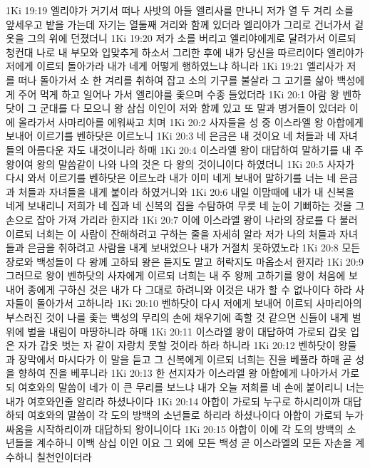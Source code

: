 1Ki 19:19  엘리야가 거기서 떠나 사밧의 아들 엘리사를 만나니 저가 열 두 겨리 소를 앞세우고 밭을 가는데 자기는 열둘째 겨리와 함께 있더라 엘리야가 그리로 건너가서 겉옷을 그의 위에 던졌더니
1Ki 19:20  저가 소를 버리고 엘리야에게로 달려가서 이르되 청컨대 나로 내 부모와 입맞추게 하소서 그리한 후에 내가 당신을 따르리이다 엘리야가 저에게 이르되 돌아가라 내가 네게 어떻게 행하였느냐 하니라
1Ki 19:21  엘리사가 저를 떠나 돌아가서 소 한 겨리를 취하여 잡고 소의 기구를 불살라 그 고기를 삶아 백성에게 주어 먹게 하고 일어나 가서 엘리야를 좇으며 수종 들었더라
1Ki 20:1  아람 왕 벤하닷이 그 군대를 다 모으니 왕 삼십 이인이 저와 함께 있고 또 말과 병거들이 있더라 이에 올라가서 사마리아를 에워싸고 치며
1Ki 20:2  사자들을 성 중 이스라엘 왕 아합에게 보내어 이르기를 벤하닷은 이르노니
1Ki 20:3  네 은금은 내 것이요 네 처들과 네 자녀들의 아름다운 자도 내것이니라 하매
1Ki 20:4  이스라엘 왕이 대답하여 말하기를 내 주 왕이여 왕의 말씀같이 나와 나의 것은 다 왕의 것이니이다 하였더니
1Ki 20:5  사자가 다시 와서 이르기를 벤하닷은 이르노라 내가 이미 네게 보내어 말하기를 너는 네 은금과 처들과 자녀들을 내게 붙이라 하였거니와
1Ki 20:6  내일 이맘때에 내가 내 신복을 네게 보내리니 저희가 네 집과 네 신복의 집을 수탐하여 무릇 네 눈이 기뻐하는 것을 그 손으로 잡아 가져 가리라 한지라
1Ki 20:7  이에 이스라엘 왕이 나라의 장로를 다 불러 이르되 너희는 이 사람이 잔해하려고 구하는 줄을 자세히 알라 저가 나의 처들과 자녀들과 은금을 취하려고 사람을 내게 보내었으나 내가 거절치 못하였노라
1Ki 20:8  모든 장로와 백성들이 다 왕께 고하되 왕은 듣지도 말고 허락지도 마옵소서 한지라
1Ki 20:9  그러므로 왕이 벤하닷의 사자에게 이르되 너희는 내 주 왕께 고하기를 왕이 처음에 보내어 종에게 구하신 것은 내가 다 그대로 하려니와 이것은 내가 할 수 없나이다 하라 사자들이 돌아가서 고하니라
1Ki 20:10  벤하닷이 다시 저에게 보내어 이르되 사마리아의 부스러진 것이 나를 좇는 백성의 무리의 손에 채우기에 족할 것 같으면 신들이 내게 벌 위에 벌을 내림이 마땅하니라 하매
1Ki 20:11  이스라엘 왕이 대답하여 가로되 갑옷 입은 자가 갑옷 벗는 자 같이 자랑치 못할 것이라 하라 하니라
1Ki 20:12  벤하닷이 왕들과 장막에서 마시다가 이 말을 듣고 그 신복에게 이르되 너희는 진을 베풀라 하매 곧 성을 향하여 진을 베푸니라
1Ki 20:13  한 선지자가 이스라엘 왕 아합에게 나아가서 가로되 여호와의 말씀이 네가 이 큰 무리를 보느냐 내가 오늘 저희를 네 손에 붙이리니 너는 내가 여호와인줄 알리라 하셨나이다
1Ki 20:14  아합이 가로되 누구로 하시리이까 대답하되 여호와의 말씀이 각 도의 방백의 소년들로 하리라 하셨나이다 아합이 가로되 누가 싸움을 시작하리이까 대답하되 왕이니이다
1Ki 20:15  아합이 이에 각 도의 방백의 소년들을 계수하니 이백 삼십 이인 이요 그 외에 모든 백성 곧 이스라엘의 모든 자손을 계수하니 칠천인이더라
